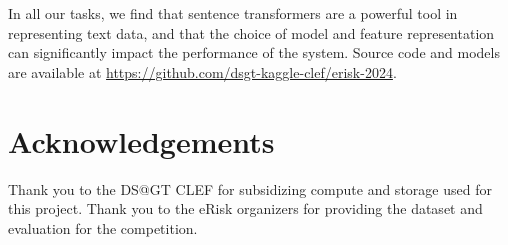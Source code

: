 \documentclass[]{style/ceurart}
\begin{document}
In all our tasks, we find that sentence transformers are a powerful tool in representing text data, and that the choice of model and feature representation can significantly impact the performance of the system.
Source code and models are available at \url{https://github.com/dsgt-kaggle-clef/erisk-2024}.

\section*{Acknowledgements}

Thank you to the DS@GT CLEF for subsidizing compute and storage used for this project.
Thank you to the eRisk organizers for providing the dataset and evaluation for the competition.



\end{document}
